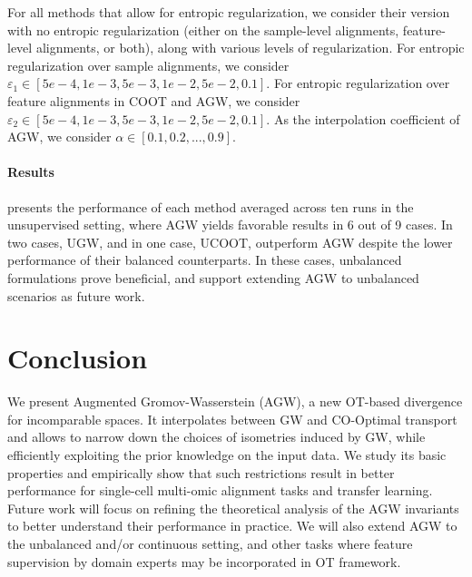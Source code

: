 For all methods that allow for entropic regularization,
we consider their version with no entropic regularization (either on the sample-level alignments,
feature-level alignments, or both), along with various levels of regularization.
For entropic regularization over sample alignments, we consider
$\varepsilon_1 \in [ 5e-4, 1e-3, 5e-3, 1e-2, 5e-2, 0.1] $. For entropic regularization over
feature alignments in COOT and AGW, we consider $\varepsilon_2 \in [ 5e-4, 1e-3, 5e-3, 1e-2, 5e-2, 0.1]$.
As the interpolation coefficient of AGW, we consider $\alpha \in [ 0.1, 0.2, ..., 0.9]$.

\paragraph{Results}  presents the performance of each method averaged across
ten runs in the unsupervised setting, where AGW yields favorable results in 6 out of 9 cases.
In two cases, UGW, and in one case, UCOOT, outperform AGW despite the lower performance of
their balanced counterparts. In these cases, unbalanced formulations prove beneficial,
and support extending AGW to unbalanced scenarios as future work.

\section{Conclusion}

We present Augmented Gromov-Wasserstein (AGW), a new OT-based divergence for incomparable spaces.
It interpolates between GW and CO-Optimal transport and allows to narrow down the
choices of isometries induced by GW, while efficiently exploiting the prior knowledge
on the input data. We study its basic properties and empirically show that such restrictions
result in better performance for single-cell multi-omic alignment tasks and transfer learning.
Future work will focus on refining the theoretical analysis of the AGW invariants to
better understand their performance in practice. We will also extend AGW to the unbalanced
and/or continuous setting, and other tasks where feature supervision by domain experts
may be incorporated in OT framework.

\vfill